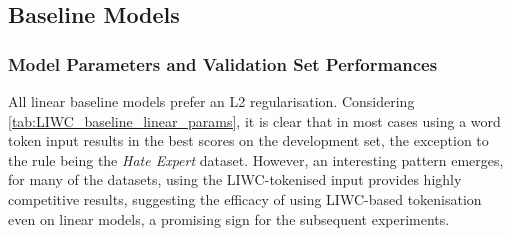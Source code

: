 \subsection{Baseline Models}  
  
\subsubsection{Model Parameters and Validation Set Performances}  
All linear baseline models prefer an L2 regularisation.  
Considering \cref{tab:LIWC_baseline_linear_params}, it is clear that in most cases using a word token input results in the best scores on the development set, the exception to the rule being the \textit{Hate Expert} dataset.  
However, an interesting pattern emerges, for many of the datasets, using the LIWC-tokenised input provides highly competitive results, suggesting the efficacy of using LIWC-based tokenisation even on linear models, a promising sign for the subsequent experiments.  
  
